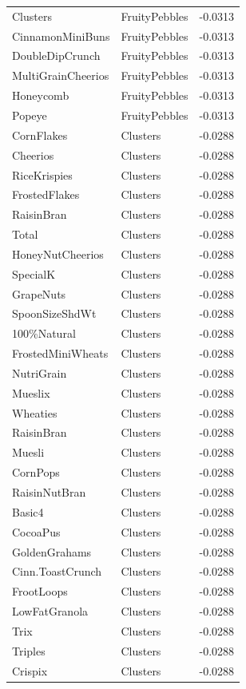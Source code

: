 \begin{table}[!htbp]
\begin{tabular}{lll}
\\
Clusters & FruityPebbles & -0.0313
\\
CinnamonMiniBuns & FruityPebbles & -0.0313
\\
DoubleDipCrunch & FruityPebbles & -0.0313
\\
MultiGrainCheerios & FruityPebbles & -0.0313
\\
Honeycomb & FruityPebbles & -0.0313
\\
Popeye & FruityPebbles & -0.0313
\\
CornFlakes & Clusters & -0.0288
\\
Cheerios & Clusters & -0.0288
\\
RiceKrispies & Clusters & -0.0288
\\
FrostedFlakes & Clusters & -0.0288
\\
RaisinBran & Clusters & -0.0288
\\
Total & Clusters & -0.0288
\\
HoneyNutCheerios & Clusters & -0.0288
\\
SpecialK & Clusters & -0.0288
\\
GrapeNuts & Clusters & -0.0288
\\
SpoonSizeShdWt & Clusters & -0.0288
\\
100\%Natural & Clusters & -0.0288
\\
FrostedMiniWheats & Clusters & -0.0288
\\
NutriGrain & Clusters & -0.0288
\\
Mueslix & Clusters & -0.0288
\\
Wheaties & Clusters & -0.0288
\\
RaisinBran & Clusters & -0.0288
\\
Muesli & Clusters & -0.0288
\\
CornPops & Clusters & -0.0288
\\
RaisinNutBran & Clusters & -0.0288
\\
Basic4 & Clusters & -0.0288
\\
CocoaPus & Clusters & -0.0288
\\
GoldenGrahams & Clusters & -0.0288
\\
Cinn.ToastCrunch & Clusters & -0.0288
\\
FrootLoops & Clusters & -0.0288
\\
LowFatGranola & Clusters & -0.0288
\\
Trix & Clusters & -0.0288
\\
Triples & Clusters & -0.0288
\\
Crispix & Clusters & -0.0288
\\

\end{tabular}
\end{table}
